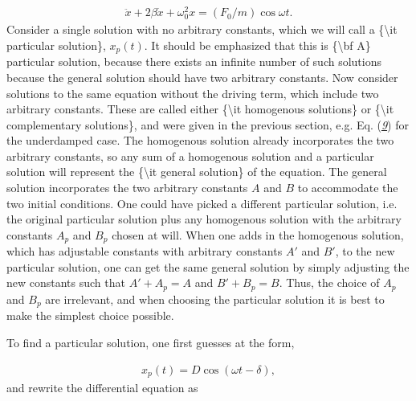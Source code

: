 \documentclass[letterpaper,10pt,english]{sphinxmanual}
\begin{document}
\begin{equation*}
\begin{split}
\begin{equation}
\label{eq:drivenosc} \tag{12}
\ddot{x}+2\beta\dot{x}+\omega_0^2x=(F_0/m)\cos\omega t.
\end{equation}
\end{split}
\end{equation*}
Consider a single solution with no arbitrary constants, which we will
call a \{\textbackslash{}it particular solution\}, \(x_p(t)\). It should be emphasized
that this is \{\textbackslash{}bf A\} particular solution, because there exists an
infinite number of such solutions because the general solution should
have two arbitrary constants. Now consider solutions to the same
equation without the driving term, which include two arbitrary
constants. These are called either \{\textbackslash{}it homogenous solutions\} or \{\textbackslash{}it
complementary solutions\}, and were given in the previous section,
e.g. Eq. ({\hyperref[\detokenize{chapter4:eq:homogsolution}]{\emph{9}}}) for the underdamped case. The
homogenous solution already incorporates the two arbitrary constants,
so any sum of a homogenous solution and a particular solution will
represent the \{\textbackslash{}it general solution\} of the equation. The general
solution incorporates the two arbitrary constants \(A\) and \(B\) to
accommodate the two initial conditions. One could have picked a
different particular solution, i.e. the original particular solution
plus any homogenous solution with the arbitrary constants \(A_p\) and
\(B_p\) chosen at will. When one adds in the homogenous solution, which
has adjustable constants with arbitrary constants \(A'\) and \(B'\), to
the new particular solution, one can get the same general solution by
simply adjusting the new constants such that \(A'+A_p=A\) and
\(B'+B_p=B\). Thus, the choice of \(A_p\) and \(B_p\) are irrelevant, and
when choosing the particular solution it is best to make the simplest
choice possible.

To find a particular solution, one first guesses at the form,




\begin{equation*}
\begin{split}
\begin{equation}
\label{eq:partform} \tag{13}
x_p(t)=D\cos(\omega t-\delta),
\end{equation}
\end{split}
\end{equation*}
and rewrite the differential equation as
\end{document}
